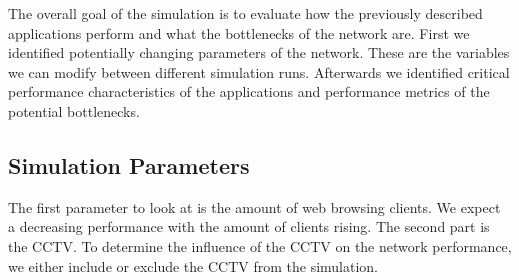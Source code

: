 \documentclass[
10pt, %
a4paper, %
oneside, %
headinclude,footinclude, %
BCOR5mm, %
]{scrartcl}
\begin{document}
The overall goal of the simulation is to evaluate how the previously described applications perform and what the bottlenecks of the network are. First we identified potentially changing parameters of the network. These are the variables we can modify between different simulation runs. Afterwards we identified critical performance characteristics of the applications and performance metrics of the potential bottlenecks.

\subsection{Simulation Parameters}
The first parameter to look at is the amount of web browsing clients. We expect a decreasing performance with the amount of clients rising.
The second part is the CCTV. To determine the influence of the CCTV on the network performance, we either include or exclude the CCTV from the simulation.
\end{document}
